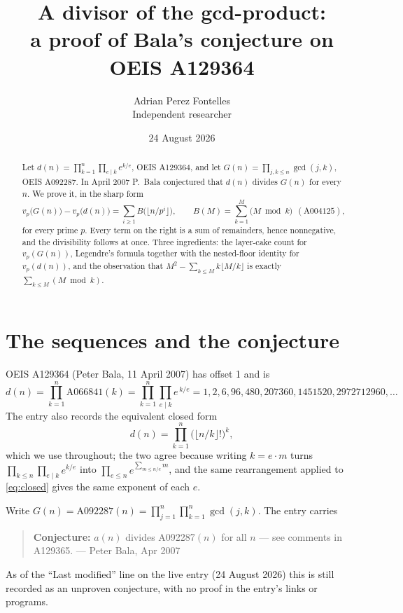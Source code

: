 \documentclass[11pt,a4paper]{article}
\title{A divisor of the gcd-product:\\
a proof of Bala's conjecture on OEIS A129364}
\author{Adrian Perez Fontelles\\ \small Independent researcher}
\date{24 August 2026}
\theoremstyle{plain}
\theoremstyle{definition}
\begin{document}
\maketitle

\begin{abstract}
Let $d(n)=\prod_{k=1}^{n}\prod_{e\mid k}e^{k/e}$, OEIS A129364, and let
$G(n)=\prod_{j,k\le n}\gcd(j,k)$, OEIS A092287. In April 2007 P.~Bala conjectured that
$d(n)$ divides $G(n)$ for every $n$. We prove it, in the sharp form
\[
  v_{p}\bigl(G(n)\bigr)-v_{p}\bigl(d(n)\bigr)=\sum_{i\ge1}B\bigl(\lfloor n/p^{i}\rfloor
  \bigr),\qquad B(M)=\sum_{k=1}^{M}\bigl(M\bmod k\bigr)\ \ (\text{A004125}),
\]
for every prime $p$. Every term on the right is a sum of remainders, hence nonnegative, and
the divisibility follows at once. Three ingredients: the layer-cake count for
$v_{p}(G(n))$, Legendre's formula together with the nested-floor identity for
$v_{p}(d(n))$, and the observation that $M^{2}-\sum_{k\le M}k\lfloor M/k\rfloor$ is exactly
$\sum_{k\le M}(M\bmod k)$.
\end{abstract}

\section{The sequences and the conjecture}

OEIS A129364 (Peter Bala, 11 April 2007) has offset 1 and is
\[
  d(n)=\prod_{k=1}^{n}\mathrm{A066841}(k)=\prod_{k=1}^{n}\prod_{e\mid k}e^{\,k/e}
  =1,2,6,96,480,207360,1451520,2972712960,\dots
\]
The entry also records the equivalent closed form
\begin{equation}\label{eq:closed}
  d(n)=\prod_{k=1}^{n}\bigl(\lfloor n/k\rfloor!\bigr)^{k},
\end{equation}
which we use throughout; the two agree because writing $k=e\cdot m$ turns
$\prod_{k\le n}\prod_{e\mid k}e^{k/e}$ into $\prod_{e\le n}e^{\sum_{m\le n/e}m}$, and the
same rearrangement applied to \eqref{eq:closed} gives the same exponent of each $e$.

Write $G(n)=\mathrm{A092287}(n)=\prod_{j=1}^{n}\prod_{k=1}^{n}\gcd(j,k)$. The entry carries

\begin{quote}
\textbf{Conjecture:} $a(n)$ divides A092287$(n)$ for all $n$ --- see comments in A129365.
--- Peter Bala, Apr 2007
\end{quote}

As of the ``Last modified'' line on the live entry (24 August 2026) this is still recorded
as an unproven conjecture, with no proof in the entry's links or programs.
\end{document}
